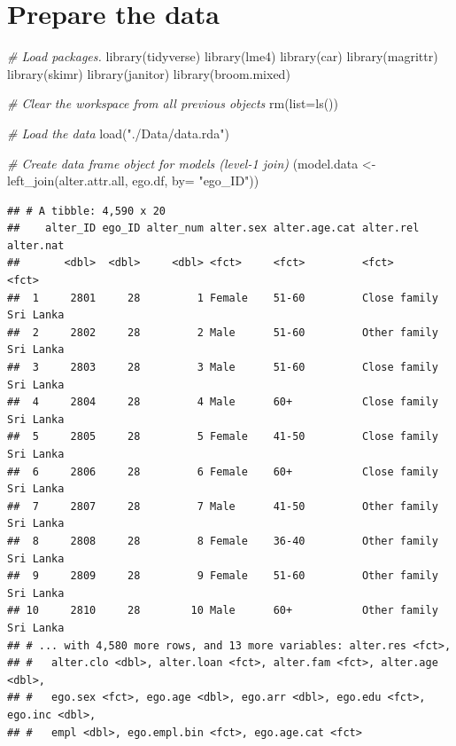 \documentclass[
]{book}
\newenvironment{Shaded}{\begin{snugshade}}{\end{snugshade}}
\newcommand{\AttributeTok}[1]{\textcolor[rgb]{0.77,0.63,0.00}{#1}}
\newcommand{\CommentTok}[1]{\textcolor[rgb]{0.56,0.35,0.01}{\textit{#1}}}
\newcommand{\FunctionTok}[1]{\textcolor[rgb]{0.00,0.00,0.00}{#1}}
\newcommand{\NormalTok}[1]{#1}
\newcommand{\OtherTok}[1]{\textcolor[rgb]{0.56,0.35,0.01}{#1}}
\newcommand{\StringTok}[1]{\textcolor[rgb]{0.31,0.60,0.02}{#1}}
\begin{document}
\hypertarget{prepare-the-data}{%
\section{Prepare the data}\label{prepare-the-data}}

\begin{Shaded}
\begin{Highlighting}[]
\CommentTok{\# Load packages.}
\FunctionTok{library}\NormalTok{(tidyverse)}
\FunctionTok{library}\NormalTok{(lme4)}
\FunctionTok{library}\NormalTok{(car)}
\FunctionTok{library}\NormalTok{(magrittr)}
\FunctionTok{library}\NormalTok{(skimr)}
\FunctionTok{library}\NormalTok{(janitor)}
\FunctionTok{library}\NormalTok{(broom.mixed)}

\CommentTok{\# Clear the workspace from all previous objects}
\FunctionTok{rm}\NormalTok{(}\AttributeTok{list=}\FunctionTok{ls}\NormalTok{())}

\CommentTok{\# Load the data}
\FunctionTok{load}\NormalTok{(}\StringTok{"./Data/data.rda"}\NormalTok{)}

\CommentTok{\# Create data frame object for models (level{-}1 join)}
\NormalTok{(model.data }\OtherTok{\textless{}{-}} \FunctionTok{left\_join}\NormalTok{(alter.attr.all, ego.df, }\AttributeTok{by=} \StringTok{"ego\_ID"}\NormalTok{))}
\end{Highlighting}
\end{Shaded}

\begin{verbatim}
## # A tibble: 4,590 x 20
##    alter_ID ego_ID alter_num alter.sex alter.age.cat alter.rel    alter.nat
##       <dbl>  <dbl>     <dbl> <fct>     <fct>         <fct>        <fct>    
##  1     2801     28         1 Female    51-60         Close family Sri Lanka
##  2     2802     28         2 Male      51-60         Other family Sri Lanka
##  3     2803     28         3 Male      51-60         Close family Sri Lanka
##  4     2804     28         4 Male      60+           Close family Sri Lanka
##  5     2805     28         5 Female    41-50         Close family Sri Lanka
##  6     2806     28         6 Female    60+           Close family Sri Lanka
##  7     2807     28         7 Male      41-50         Other family Sri Lanka
##  8     2808     28         8 Female    36-40         Other family Sri Lanka
##  9     2809     28         9 Female    51-60         Other family Sri Lanka
## 10     2810     28        10 Male      60+           Other family Sri Lanka
## # ... with 4,580 more rows, and 13 more variables: alter.res <fct>,
## #   alter.clo <dbl>, alter.loan <fct>, alter.fam <fct>, alter.age <dbl>,
## #   ego.sex <fct>, ego.age <dbl>, ego.arr <dbl>, ego.edu <fct>, ego.inc <dbl>,
## #   empl <dbl>, ego.empl.bin <fct>, ego.age.cat <fct>
\end{verbatim}
\end{document}
